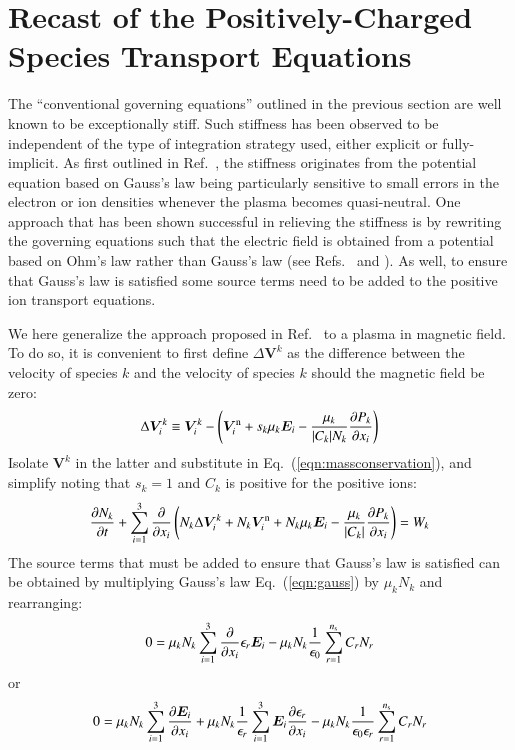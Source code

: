\documentclass{warpdoc}
\newcommand{\ns}{{n_{\rm s}}}
\renewcommand{\vec}[1]{\bm{#1}}
\begin{document}
\section{Recast of the Positively-Charged Species Transport Equations}


The ``conventional governing equations'' outlined in the previous section are well known to be exceptionally stiff. Such stiffness has been observed to be independent of the type of integration strategy used, either explicit or fully-implicit. As first outlined in Ref.\ \cite{jcp:2013:parent}, the stiffness originates from the potential equation based on Gauss's law being particularly sensitive to small errors in the electron or ion densities whenever the plasma becomes quasi-neutral. One approach that has been shown successful in relieving the stiffness is by rewriting the governing equations such that the electric field is obtained from a potential based on Ohm's law rather than Gauss's law (see Refs.\ \cite{jcp:2013:parent} and \cite{jcp:2014:parent}). As well, to ensure that Gauss's law is satisfied some source terms need to be added to the positive ion transport equations. 

We here generalize the approach proposed in Ref.\ \cite{jcp:2014:parent} to a plasma in magnetic field. To do so, it is convenient to first define $\Delta \vec{V}^k$ as the difference between the velocity of species $k$ and the velocity of species $k$ should the magnetic field be zero:
%
\begin{equation}
\Delta \vec{V}^k_i \equiv \vec{V}^k_i - \left(\vec{V}^{\rm n}_i+ s_k \mu_k  \vec{E}_i
             -   \frac{\mu_k}{|C_k| N_k} \frac{\partial P_k}{\partial x_i}\right)
\label{eqn:deltaV}
\end{equation}
%
Isolate $\vec{V}^k$ in the latter and substitute in Eq.\ (\ref{eqn:massconservation}), and simplify noting that $s_k=1$ and $C_k$ is positive for the positive ions: 
%
\begin{equation}
  \frac{\partial N_{k}}{\partial t} + \sum_{i=1}^3 \frac{\partial}{\partial x_i} \left(N_k \Delta \vec{V}_i^k +N_{k} \vec{V}^{\rm n}_i+N_{k}  \mu_k   \vec{E}_i
             -    \frac{\mu_k }{|C_{k}| } \frac{\partial P_{k}}{\partial x_i}\right) = W_{k}
\label{eqn:positive_ion_1}
\end{equation}
%
The source terms that must be added to ensure that Gauss's law is satisfied can be obtained by multiplying Gauss's law Eq.\ (\ref{eqn:gauss}) by $\mu_{k} N_{k}$ and rearranging:
%
\begin{equation}
0=\mu_{k} N_{k} \sum_{i=1}^3 \frac{\partial }{\partial x_i}\epsilon_r \vec{E}_i -\mu_{k} N_{k}\frac{1}{\epsilon_0} \sum_{r=1}^\ns C_r N_r 
\end{equation}
%
or
%
\begin{equation}
0=
 \mu_{k} N_{k}  \sum_{i=1}^3 \frac{\partial \vec{E}_i}{\partial x_i}  
+\mu_{k} N_{k}\frac{1}{\epsilon_r} \sum_{i=1}^3 \vec{E}_i \frac{\partial \epsilon_r}{\partial x_i}  
-\mu_{k} N_{k}\frac{1}{\epsilon_0 \epsilon_r} \sum_{r=1}^\ns C_r N_r 
\end{equation}
%
\end{document}
